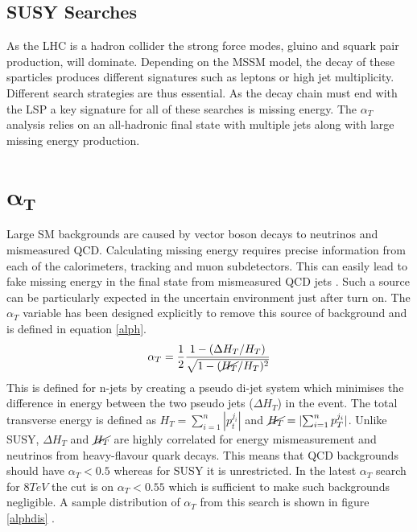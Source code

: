 \subsection{SUSY Searches}
As the LHC is a hadron collider the strong force modes, gluino and squark pair production, will dominate. Depending on the MSSM model, the decay of these sparticles produces different signatures such as leptons or high jet multiplicity. Different search strategies are thus essential. As the decay chain must end with the LSP a key signature for all of these searches is missing energy. The $\alpha_T$ analysis relies on an all-hadronic final state with multiple jets along with large missing energy production. 

\section{$\boldsymbol{\alpha_T}$}
Large SM backgrounds are caused by vector boson decays to neutrinos and mismeasured QCD. Calculating missing energy requires precise information from each of the calorimeters, tracking and muon subdetectors. This can easily lead to fake missing energy in the final state from mismeasured QCD jets \cite{randall}. Such a source can be particularly expected in the uncertain environment just after turn on.  The $\alpha_T$ variable has been designed explicitly to remove this source of background and is defined in equation \ref{alph}.
\begin{equation}
\label{alph}
\alpha_T=\frac{1}{2}\frac{1-(\Delta H_T/H_T)}{\sqrt{1-(\cancel{H_T}/H_T)^2}}
\end{equation}
This is defined for n-jets by creating a pseudo di-jet system which minimises the difference in energy between the two pseudo jets ($\Delta H_T$) in the event. The total transverse energy is defined as $H_T=\sum_{i=1}^n|p_t^{j_i}|$ and $\cancel{H_T}=|{\sum_{i=1}^n p_T^{j_i}}|$. Unlike SUSY, $\Delta H_T$ and $\cancel{H_T}$ are highly correlated for energy mismeasurement and neutrinos from heavy-flavour quark decays. This means that QCD backgrounds should have $\alpha_T<0.5$ whereas for SUSY it is unrestricted. In the latest $\alpha_T$ search for $8 TeV$ the cut is on $\alpha_T<0.55$ which is sufficient to make such backgrounds negligible. A sample distribution of $\alpha_T$ from this search is shown in figure \ref{alphdis} \cite{CMSAT8}.
